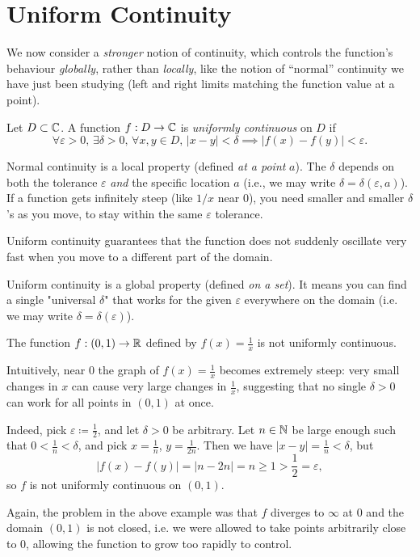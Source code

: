 \documentclass[../analysis1.tex]{subfiles}
\begin{document}
\section{Uniform Continuity}
We now consider a \textit{stronger} notion of continuity, which controls the function's behaviour \textit{globally}, rather than \textit{locally}, like the notion of ``normal'' continuity we have just been studying (left and right limits matching the function value at a point).
\begin{definition}
    \begin{shaded*}
        Let $D\subset\mathbb{C}$. A function $f: D \to \mathbb{C}$ is \textit{uniformly continuous} on $D$ if
        \[\forall \varepsilon > 0,\,\exists \delta > 0,\,\forall x, y \in D,\, |x-y|<\delta\implies |f(x)-f(y)|<\varepsilon.\]
    \end{shaded*}
\end{definition}

\begin{remark}
    Normal continuity is a local property (defined \textit{at a point} $a$). The $\delta$ depends on both the tolerance $\varepsilon$ \textit{and} the specific location $a$ (i.e., we may write $\delta=\delta(\varepsilon,a)$). If a function gets infinitely steep (like $1/x$ near $0$), you need smaller and smaller $\delta$'s as you move, to stay within the same $\varepsilon$ tolerance.
    
    Uniform continuity guarantees that the function does not suddenly oscillate very fast when you move to a diﬀerent part of the domain.

    Uniform continuity is a global property (defined \textit{on a set}). It means you can find a single "universal $\delta$" that works for the given $\varepsilon$ everywhere on the domain (i.e. we may write $\delta=\delta(\varepsilon)$).
\end{remark}

\begin{example}
    The function $f:(0,1)\to\mathbb{R}$ defined by $f(x)=\frac{1}{x}$ is not uniformly continuous.

    Intuitively, near 0 the graph of $f(x) = \frac{1}{x}$ becomes extremely steep: very small changes in $x$ can cause very large changes in $\frac{1}{x}$, suggesting that no single $\delta>0$ can work for all points in $(0,1)$ at once.

    Indeed, pick $\varepsilon\coloneqq \frac{1}{2}$, and let $\delta>0$ be arbitrary. Let $n\in\mathbb{N}$ be large enough such that $0<\frac{1}{n}<\delta$, and pick $x=\frac{1}{n}$, $y=\frac{1}{2n}$. Then we have $|x-y|=\frac{1}{n}<\delta$, but
    \[|f(x)-f(y)|=|n-2n|=n\ge 1>\frac{1}{2}=\varepsilon,\]
    so $f$ is not uniformly continuous on $(0,1)$.
\end{example}
Again, the problem in the above example was that $f$ diverges to $\infty$ at 0 and the domain $(0,1)$ is not closed, i.e. we were allowed to take points arbitrarily close to 0, allowing the function to grow too rapidly to control.
\end{document}
